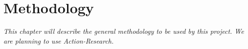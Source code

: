 \chapter{Methodology}

\textit{This chapter will describe the general methodology to be used by this project.
We are planning to use Action-Research.}

